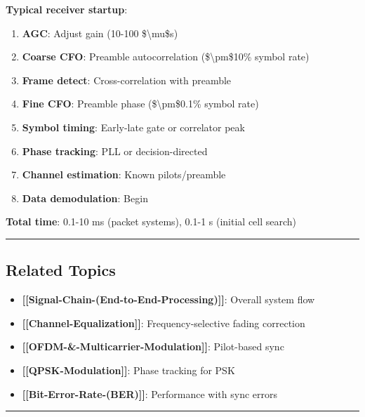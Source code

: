 \textbf{Typical receiver startup}:

\begin{enumerate}
\def\labelenumi{\arabic{enumi}.}
\tightlist
\item
  \textbf{AGC}: Adjust gain (10-100 \$\textbackslash mu\$s)
\item
  \textbf{Coarse CFO}: Preamble autocorrelation
  (\$\textbackslash pm\$10\% symbol rate)
\item
  \textbf{Frame detect}: Cross-correlation with preamble
\item
  \textbf{Fine CFO}: Preamble phase (\$\textbackslash pm\$0.1\% symbol
  rate)
\item
  \textbf{Symbol timing}: Early-late gate or correlator peak
\item
  \textbf{Phase tracking}: PLL or decision-directed
\item
  \textbf{Channel estimation}: Known pilots/preamble
\item
  \textbf{Data demodulation}: Begin
\end{enumerate}

\textbf{Total time}: 0.1-10 ms (packet systems), 0.1-1 s (initial cell
search)

\begin{center}\rule{0.5\linewidth}{0.5pt}\end{center}

\subsection{Related Topics}\label{related-topics}

\begin{itemize}
\tightlist
\item
  \textbf{{[}{[}Signal-Chain-(End-to-End-Processing){]}{]}}: Overall
  system flow
\item
  \textbf{{[}{[}Channel-Equalization{]}{]}}: Frequency-selective fading
  correction
\item
  \textbf{{[}{[}OFDM-\&-Multicarrier-Modulation{]}{]}}: Pilot-based sync
\item
  \textbf{{[}{[}QPSK-Modulation{]}{]}}: Phase tracking for PSK
\item
  \textbf{{[}{[}Bit-Error-Rate-(BER){]}{]}}: Performance with sync
  errors
\end{itemize}

\begin{center}\rule{0.5\linewidth}{0.5pt}\end{center}

